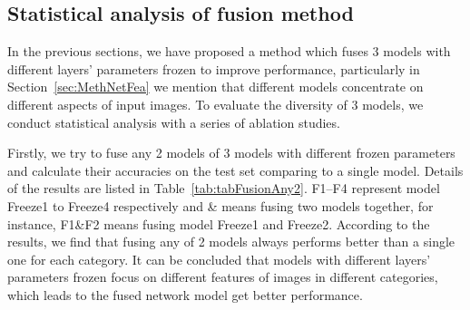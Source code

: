 \documentclass[12pt]{article}
\begin{document}
\subsection{Statistical analysis of fusion method}
\label{ExpSA}

In the previous sections, we have proposed 
a method which fuses 3 models with different 
layers’ parameters frozen to improve 
performance, particularly in 
Section~\ref{sec:MethNetFea} 
we mention that different models 
concentrate on different aspects of input 
images. To evaluate the diversity of 3 
models, we conduct statistical analysis with 
a series of ablation studies.

Firstly, we try to fuse any 2 models of 3 
models with different frozen parameters and 
calculate their accuracies on the test set 
comparing to a single model. Details of
the results are listed in 
Table~\ref{tab:tabFusionAny2}. 
F1–F4 represent model Freeze1 to Freeze4 
respectively and \& means fusing two
models together, for instance, F1\&F2 
means fusing model Freeze1 and Freeze2. 
According to the results, we find that 
fusing any of 2 models always performs 
better than a single one for each category. 
It can be concluded that models with 
different layers’ parameters frozen focus 
on different features of images in different 
categories, which leads to the fused network 
model get better performance.
\end{document}
